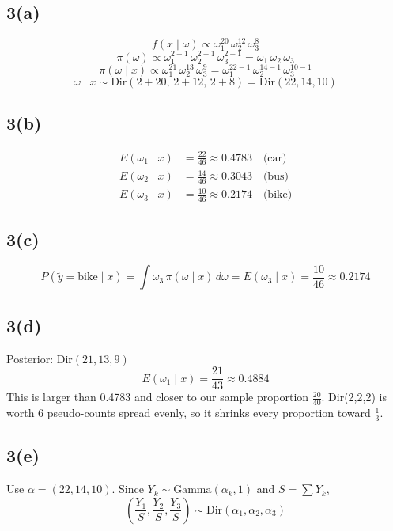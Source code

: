 \documentclass[11pt]{article}
\begin{document}
\subsection*{3(a)}
\[
f(x\mid\omega) \propto \omega_1^{20}\,\omega_2^{12}\,\omega_3^{8}
\]
\[
\pi(\omega) \propto \omega_1^{2-1}\,\omega_2^{2-1}\,\omega_3^{2-1} = \omega_1\,\omega_2\,\omega_3
\]
\[
\pi(\omega\mid x) \propto \omega_1^{21}\,\omega_2^{13}\,\omega_3^{9} = \omega_1^{22-1}\,\omega_2^{14-1}\,\omega_3^{10-1}
\]
\[
\boxed{\omega\mid x \sim \text{Dir}(2+20,\,2+12,\,2+8) = \text{Dir}(22,14,10)}
\]

\subsection*{3(b)}
\begin{align*}
E(\omega_1\mid x) &= \frac{22}{46} \approx 0.4783 \quad \text{(car)} \\
E(\omega_2\mid x) &= \frac{14}{46} \approx 0.3043 \quad \text{(bus)} \\
E(\omega_3\mid x) &= \frac{10}{46} \approx 0.2174 \quad \text{(bike)}
\end{align*}

\subsection*{3(c)}
\[
P(\tilde{y} = \text{bike}\mid x) = \int \omega_3\,\pi(\omega\mid x)\,d\omega = E(\omega_3\mid x) = \frac{10}{46} \approx 0.2174
\]

\subsection*{3(d)}
Posterior: $\text{Dir}(21,13,9)$
\[
E(\omega_1\mid x) = \frac{21}{43} \approx 0.4884
\]
This is larger than 0.4783 and closer to our sample proportion $\frac{20}{40}$. Dir(2,2,2) is worth 6 pseudo-counts spread evenly, so it shrinks every proportion toward $\frac{1}{3}$.

\subsection*{3(e)}
Use $\alpha = (22,14,10)$. Since $Y_k \sim \text{Gamma}(\alpha_k,1)$ and $S = \sum Y_k$,
\[
\left(\frac{Y_1}{S},\frac{Y_2}{S},\frac{Y_3}{S}\right) \sim \text{Dir}(\alpha_1,\alpha_2,\alpha_3)
\]

\end{document}
